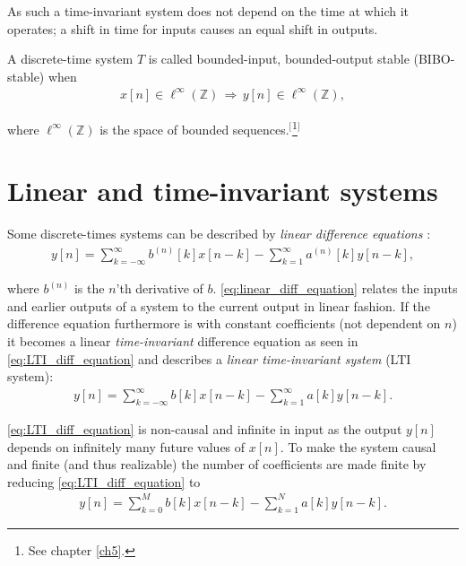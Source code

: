 As such a time-invariant system does not depend on the time at which it operates; a shift in time for inputs causes an equal shift in outputs.

\begin{definition}\label{def:BIBO_stable_system}
A discrete-time system $T$ is called bounded-input, bounded-output stable (BIBO-stable) when
\begin{align}
x[n]\in\ell^{\infty}(\mathbb{Z})\,\Rightarrow\,y[n]\in\ell^{\infty}(\mathbb{Z}),
\end{align}

where $\ell^{\infty}(\mathbb{Z})$ is the space of bounded sequences.$^[$\footnote{See chapter \ref{ch5}.}$^]$
\end{definition}

\section{Linear and time-invariant systems}\label{sec:LTI}
Some discrete-times systems can be described by \textit{linear difference equations} \cite{page 202, FSP}:
\begin{align} \label{eq:linear_diff_equation}
y[n] = \sum_{k=-\infty}^{\infty} b^{(n)} [k] x[n-k] - \sum_{k=1}^{\infty} a^{(n)} [k] y[n-k],
\end{align}

where $b^{(n)}$ is the $n$'th derivative of $b$. \eqref{eq:linear_diff_equation} relates the inputs and earlier outputs of a system to the current output in linear fashion. If the difference equation furthermore is with constant coefficients (not dependent on $n$) it becomes a linear \textit{time-invariant} difference equation as seen in \eqref{eq:LTI_diff_equation} and describes a \textit{linear time-invariant system} (LTI system):
\begin{align}\label{eq:LTI_diff_equation}
y[n] = \sum_{k=-\infty}^{\infty} b[k] x[n-k] - \sum_{k=1}^{\infty} a[k] y[n-k].
\end{align}

\eqref{eq:LTI_diff_equation} is non-causal and infinite in input as the output $y[n]$ depends on infinitely many future values of $x[n]$. To make the system causal and finite (and thus realizable) the number of coefficients are made finite by reducing \eqref{eq:LTI_diff_equation} to
\begin{align}\label{eq:LTI_diff_equation_finite}
y[n] = \sum_{k=0}^M b[k] x[n-k] - \sum_{k=1}^N a[k] y[n-k].
\end{align}

